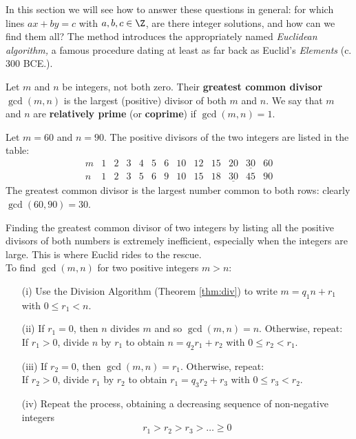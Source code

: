 In this section we will see how to answer these questions in general: for which lines $ax+by=c$ with $a,b,c\in\Z$, are there integer solutions, and how can we find them all? The method introduces the appropriately named \emph{Euclidean algorithm,} a famous procedure dating at least as far back as Euclid's \emph{Elements} (c. 300 BCE.).

\begin{defn}
Let $m$ and $n$ be integers, not both zero. Their \textbf{greatest common divisor} $\gcd(m,n)$ is the largest (positive) divisor of both $m$ and $n$. We say that $m$ and $n$ are \textbf{relatively prime} (or \textbf{coprime}) if $\gcd(m,n)=1$.
\end{defn}

\begin{example}
Let $m=60$ and $n=90$. The positive divisors of the two integers are listed in the table:
\[\begin{array}{c|cccccccccccc}
m&1&2&3&4&5&6&10&12&15&20&\underline{30}&60\\\hline
n&1&2&3&5&6&9&10&15&18&\underline{30}&45&90
\end{array}\]
The greatest common divisor is the largest number common to both rows: clearly $\gcd(60,90)=30$.
\end{example}

Finding the greatest common divisor of two integers by listing all the positive divisors of both numbers is extremely inefficient, especially when the integers are large. This is where Euclid rides to the rescue.\\

 To find $\gcd(m,n)$ for two positive integers $m>n$:

\begin{itemize}
\item[(i)] Use the Division Algorithm (Theorem \ref{thm:div}) to write $m=q_1n+r_1$ with $0\le r_1<n$.
\item[(ii)] If $r_1=0$, then $n$ divides $m$ and so $\gcd(m,n)=n$. Otherwise, repeat:\\
	If $r_1>0$, divide $n$ by $r_1$ to obtain $n=q_2r_1+r_2$ with $0\le r_2<r_1$.
\item[(iii)] If $r_2=0$, then $\gcd(m,n)=r_1$. Otherwise, repeat:\\
	If $r_2>0$, divide $r_1$ by $r_2$ to obtain $r_1=q_3r_2+r_3$ with $0\le r_3<r_2$.
\item[(iv)] Repeat the process, obtaining a decreasing sequence of non-negative integers
\[r_1>r_2>r_3>\ldots\geq 0\]
\end{itemize}


